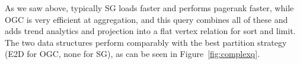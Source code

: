 As we saw above, typically SG loads faster and performs pagerank
faster, while OGC is very efficient at aggregation, and this query
combines all of these and adds trend analytics and projection into a
flat vertex relation for sort and limit.  The two data structures
perform comparably with the best partition strategy (E2D for OGC, none
for SG), as can be seen in Figure~\ref{fig:complexq}.


